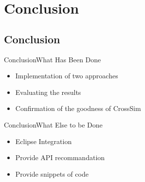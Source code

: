 \documentclass{beamer}
\begin{document}
\section{Conclusion}
\subsection{Conclusion}

\begin{frame}{Conclusion}{What Has Been Done}
	\begin{itemize}
		\item Implementation of two approaches
		\item Evaluating the results
		\item Confirmation of the goodness of CrossSim
	\end{itemize}
\end{frame}

\begin{frame}{Conclusion}{What Else to be Done}
	\begin{itemize}
		\item Eclipse Integration
		\item Provide API recommandation
		\item Provide snippets of code
	\end{itemize}
\end{frame}
\end{document}
